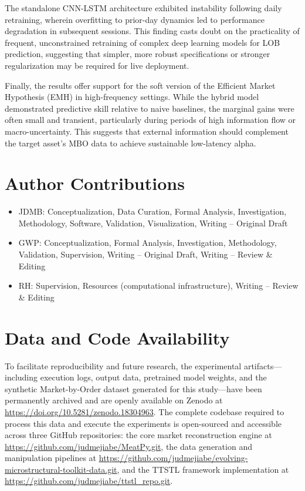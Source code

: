 \documentclass[10pt,a4paper,oneside]{article}
\begin{document}
The standalone CNN-LSTM architecture exhibited instability following daily retraining, wherein overfitting to prior-day dynamics led to performance degradation in subsequent sessions. This finding casts doubt on the practicality of frequent, unconstrained retraining of complex deep learning models for LOB prediction, suggesting that simpler, more robust specifications or stronger regularization may be required for live deployment.

Finally, the results offer support for the soft version of the Efficient Market Hypothesis (EMH) in high-frequency settings. While the hybrid model demonstrated predictive skill relative to naive baselines, the marginal gains were often small and transient, particularly during periods of high information flow or macro-uncertainty. This suggests that external information should complement the target asset's MBO data to achieve sustainable low-latency alpha.



\section*{Author Contributions}

\begin{itemize}
    \item JDMB: Conceptualization, Data Curation, Formal Analysis, Investigation, Methodology, Software, Validation, Visualization, Writing – Original Draft
    \item GWP: Conceptualization, Formal Analysis, Investigation, Methodology, Validation, Supervision, Writing – Original Draft, Writing – Review \& Editing 
    \item RH: Supervision, Resources (computational infrastructure), Writing – Review \& Editing
\end{itemize}

\section*{Data and Code Availability}
To facilitate reproducibility and future research, the experimental artifacts—including execution logs, output data, pretrained model weights, and the synthetic Market-by-Order dataset generated for this study—have been permanently archived and are openly available on Zenodo at \url{https://doi.org/10.5281/zenodo.18304963}. The complete codebase required to process this data and execute the experiments is open-sourced and accessible across three GitHub repositories: the core market reconstruction engine at \url{https://github.com/judmejiabe/MeatPy.git}, the data generation and manipulation pipelines at \url{https://github.com/judmejiabe/evolving-microstructural-toolkit-data.git}, and the TTSTL framework implementation at \url{https://github.com/judmejiabe/ttstl_repo.git}.
\end{document}

